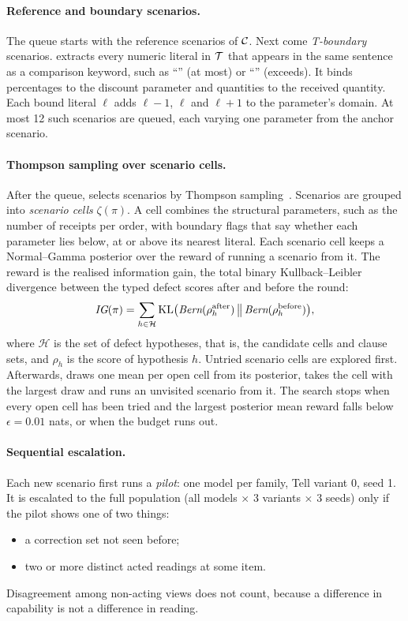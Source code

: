 \paragraph{Reference and boundary scenarios.} The queue starts with the reference scenarios of $\mathcal{C}$. Next come \emph{T-boundary} scenarios. \specdx extracts every numeric literal in $\mathcal{T}$ that appears in the same sentence as a comparison keyword, such as ``'' (at most) or ``'' (exceeds). It binds percentages to the discount parameter and quantities to the received quantity. Each bound literal $\ell$ adds $\ell-1$, $\ell$ and $\ell+1$ to the parameter's domain. At most 12 such scenarios are queued, each varying one parameter from the anchor scenario.

\paragraph{Thompson sampling over scenario cells.} After the queue, \specdx selects scenarios by Thompson sampling~\cite{thompson1933likelihood,russo2018tutorial}. Scenarios are grouped into \emph{scenario cells} $\zeta(\pi)$. A cell combines the structural parameters, such as the number of receipts per order, with boundary flags that say whether each parameter lies below, at or above its nearest literal. Each scenario cell keeps a Normal--Gamma posterior over the reward of running a scenario from it. The reward is the realised information gain, the total binary Kullback--Leibler divergence between the typed defect scores after and before the round:
\begin{equation}
\label{eq:reward}
\textit{IG}(\pi)=\sum_{h\in\mathcal{H}}\mathrm{KL}\bigl(\textit{Bern}(\rho_h^{\text{after}})\,\big\|\,\textit{Bern}(\rho_h^{\text{before}})\bigr),
\end{equation}
where $\mathcal{H}$ is the set of defect hypotheses, that is, the candidate cells and clause sets, and $\rho_h$ is the score of hypothesis $h$. Untried scenario cells are explored first. Afterwards, \specdx draws one mean per open cell from its posterior, takes the cell with the largest draw and runs an unvisited scenario from it. The search stops when every open cell has been tried and the largest posterior mean reward falls below $\epsilon=0.01$ nats, or when the budget runs out.

\paragraph{Sequential escalation.} Each new scenario first runs a \emph{pilot}: one model per family, Tell variant 0, seed 1. It is escalated to the full population (all models $\times$ 3 variants $\times$ 3 seeds) only if the pilot shows one of two things:
\begin{itemize}[leftmargin=*]
\item a correction set not seen before;
\item two or more distinct acted readings at some item.
\end{itemize}
Disagreement among non-acting views does not count, because a difference in capability is not a difference in reading.


